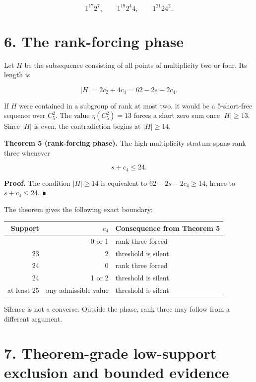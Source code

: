 \documentclass[
  11pt,
]{article}
\begin{document}
\[
1^{17}2^7, \qquad 1^{19}2^4 4, \qquad 1^{21}2 4^2.
\]

\hypertarget{the-rank-forcing-phase}{%
\section{6. The rank-forcing phase}\label{the-rank-forcing-phase}}

Let \(H\) be the subsequence consisting of all points of multiplicity
two or four. Its length is

\[
|H|=2c_2+4c_4=62-2s-2c_4.
\]

If \(H\) were contained in a subgroup of rank at most two, it would be a
5-short-free sequence over \(C_5^2\). The value \(\eta(C_5^2)=13\)
forces a short zero sum once \(|H|\ge13\). Since \(|H|\) is even, the
contradiction begins at \(|H|\ge14\).

\textbf{Theorem 5 (rank-forcing phase).} The high-multiplicity stratum
spans rank three whenever

\[
s+c_4\le24.
\]

\textbf{Proof.} The condition \(|H|\ge14\) is equivalent to
\(62-2s-2c_4\ge14\), hence to \(s+c_4\le24\). ∎

The theorem gives the following exact boundary:

\begin{longtable}[]{@{}rrl@{}}
\toprule\noalign{}
Support & \(c_4\) & Consequence from Theorem 5 \\
\midrule\noalign{}
\endhead
\bottomrule\noalign{}
\endlastfoot
23 & 0 or 1 & rank three forced \\
23 & 2 & threshold is silent \\
24 & 0 & rank three forced \\
24 & 1 or 2 & threshold is silent \\
at least 25 & any admissible value & threshold is silent \\
\end{longtable}

Silence is not a converse. Outside the phase, rank three may follow from
a different argument.

\hypertarget{theorem-grade-low-support-exclusion-and-bounded-evidence}{%
\section{7. Theorem-grade low-support exclusion and bounded
evidence}\label{theorem-grade-low-support-exclusion-and-bounded-evidence}}
\end{document}
